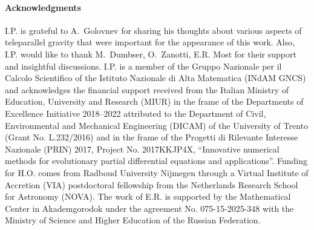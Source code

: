 \documentclass[
10pt, %
a4paper, %
oneside, %
twocolumn,
headinclude,footinclude, %
BCOR5mm, %
]{scrartcl}
\begin{document}
	\paragraph{Acknowledgments}
	I.P. is grateful to A.~Golovnev for sharing his thoughts about various
	aspects of teleparallel gravity that were important for the appearance of
	this work. Also, I.P. would like to thank M.~Dumbser, O.~Zanotti, E.R. Most
	for their support and insightful discussions. I.P. is a member of the Gruppo
	Nazionale per il Calcolo Scientifico of the Istituto Nazionale di Alta
	Matematica (INdAM GNCS) and acknowledges the financial support received from
	the Italian Ministry of Education, University and Research (MIUR) in the
	frame of the Departments of Excellence Initiative 2018–2022 attributed to
	the Department of Civil, Environmental and Mechanical Engineering (DICAM) of
	the University of Trento (Grant No. L.232/2016) and in the frame of the
	Progetti di Rilevante Interesse Nazionale (PRIN) 2017, Project No.
	2017KKJP4X, “Innovative numerical methods for evolutionary partial
	differential equations and applications”.
	Funding for H.O. comes from Radboud University Nijmegen through a Virtual
	Institute of Accretion (VIA) postdoctoral fellowship from the Netherlands
	Research School for Astronomy (NOVA).
	The work of E.R. is supported by the Mathematical Center in Akademgorodok
	under the agreement No. 075-15-2025-348 with the Ministry of Science and
	Higher Education of the Russian Federation.
	
	
	\appendix
	
\end{document}
